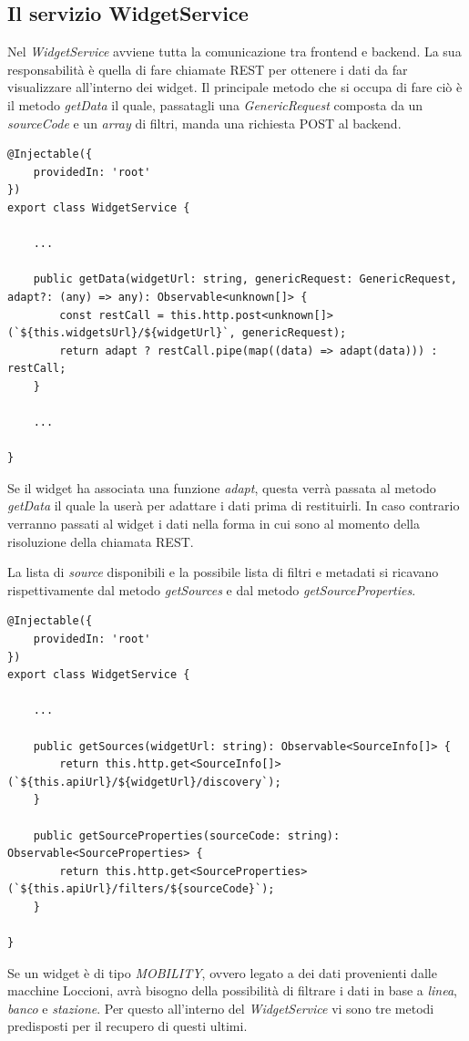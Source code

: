 \subsection{Il servizio WidgetService}
Nel \textit{WidgetService} avviene tutta la comunicazione tra frontend e backend.
La sua responsabilità è quella di fare chiamate REST per ottenere i dati da far visualizzare all'interno dei widget. Il principale metodo che si occupa di fare ciò è il metodo \textit{getData} il quale, passatagli una \textit{GenericRequest} composta da un \textit{sourceCode} e un \textit{array} di filtri, manda una richiesta POST al backend.

\begin{lstlisting}[caption={Classe WidgetService, metodo getData}, style=javaScriptCode]
@Injectable({
    providedIn: 'root'
})
export class WidgetService {

    ...

    public getData(widgetUrl: string, genericRequest: GenericRequest, adapt?: (any) => any): Observable<unknown[]> {
        const restCall = this.http.post<unknown[]>(`${this.widgetsUrl}/${widgetUrl}`, genericRequest);
        return adapt ? restCall.pipe(map((data) => adapt(data))) : restCall;
    }
    
    ...

}

\end{lstlisting}
Se il widget ha associata una funzione \textit{adapt}, questa verrà passata al metodo \textit{getData} il quale la userà per adattare i dati prima di restituirli. In caso contrario verranno passati al widget i dati nella forma in cui sono al momento della risoluzione della chiamata REST.

La lista di \textit{source} disponibili e la possibile lista di filtri e metadati si ricavano rispettivamente dal metodo \textit{getSources} e dal metodo \textit{getSourceProperties}.

\begin{lstlisting}[caption={Classe WidgetService, metodi getSources e getSourceProperties}, style=javaScriptCode]
@Injectable({
    providedIn: 'root'
})
export class WidgetService {

    ...
        
    public getSources(widgetUrl: string): Observable<SourceInfo[]> {
        return this.http.get<SourceInfo[]>(`${this.apiUrl}/${widgetUrl}/discovery`);
    }

    public getSourceProperties(sourceCode: string): Observable<SourceProperties> {
        return this.http.get<SourceProperties>(`${this.apiUrl}/filters/${sourceCode}`);
    }

}
\end{lstlisting}
Se un widget è di tipo \textit{MOBILITY}, ovvero legato a dei dati provenienti dalle macchine Loccioni, avrà bisogno della possibilità di filtrare i dati in base a \textit{linea}, \textit{banco} e \textit{stazione}. Per questo all'interno del \textit{WidgetService} vi sono tre metodi predisposti per il recupero di questi ultimi.

